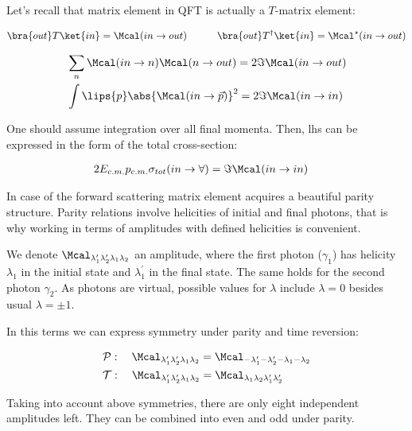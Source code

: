 Let's recall that matrix element in QFT is actually a $T$-matrix element:

\begin{align}
    & \bra{out} T \ket{in} = \Mcal(in \rightarrow out) \qquad &\bra{out} T^\dag \ket{in} = \Mcal^\star(in \rightarrow out)
\end{align}

\begin{align}
        & \sum_{n} \Mcal(in \rightarrow n)  \Mcal(n \rightarrow out) = 2 \Im \Mcal(in \rightarrow out) \\
        & \int \lips{p} \abs{\Mcal(in \rightarrow \vec{p})}^2 = 2 \Im \Mcal(in \rightarrow in)
\end{align}

One should assume integration over all final momenta. Then, lhs can be expressed in the form of the total cross-section:

\begin{align}
    & 2 E_{c.m.} p_{c.m.} \sigma_{tot}(in \rightarrow \forall) =  \Im \Mcal(in \rightarrow in) \label{eq:optical-th}
\end{align}

In case of the forward scattering matrix element acquires a beautiful parity structure. Parity relations involve helicities of initial and final photons, that is why working in terms of amplitudes with defined helicities is convenient.

We denote $\Mcal_{\lambda^\prime_1 \lambda^\prime_2 \lambda_1 \lambda_2}$ an amplitude, where the first photon ($\gamma_1$) has helicity $\lambda_1$ in the initial state and $\lambda_1^\prime$ in the final state. The same holds for the second photon $\gamma_2$. As photons are virtual, possible values for $\lambda$ include $\lambda=0$ besides usual $\lambda=\pm1$.

In this terms we can express symmetry under parity and time reversion:

\begin{align}
    & \mathcal{P}:\quad \Mcal_{\lambda_1^\prime \lambda_2^\prime \lambda_1 \lambda_2} = \Mcal_{-\lambda_1^\prime -\lambda_2^\prime -\lambda_1 -\lambda_2} \\
    & \mathcal{T}:\quad \Mcal_{\lambda_1^\prime \lambda_2^\prime \lambda_1 \lambda_2} = \Mcal_{\lambda_1 \lambda_2 \lambda_1^\prime \lambda_2^\prime}
\end{align}

Taking into account above symmetries, there are only eight independent amplitudes left. They can be combined into even and odd under parity.

